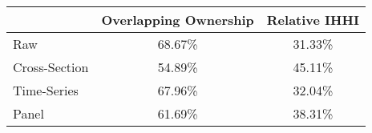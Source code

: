 \begin{tabular}{l cc}
\toprule
{} &  Overlapping Ownership &  Relative IHHI \\
\midrule
Raw           &                  68.67\% &          31.33\% \\
Cross-Section &                  54.89\% &          45.11\% \\
Time-Series   &                  67.96\% &          32.04\% \\
Panel         &                  61.69\% &          38.31\% \\
\bottomrule
\end{tabular}
